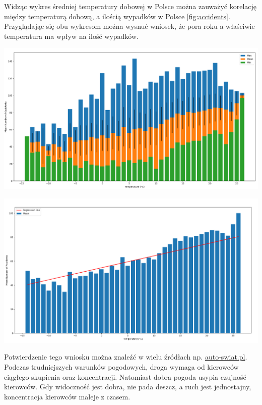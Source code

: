 \documentclass{article}
\begin{document}
Widząc wykres średniej temperatury dobowej w Polsce można zauważyć korelację między temperaturą dobową, a ilością wypadków w Polsce \ref{fig:accidents}. Przyglądając się obu wykresom można wysnuć wniosek, że pora roku a właściwie temperatura ma wpływ na ilość wypadków. 

 \begin{center}
    \includegraphics[scale=0.3]{visualization/temp_vs_accidents.png}
    \captionsetup{hypcap=false}
    \label{fig:temp_vs_accidents}
\end{center}

 \begin{center}
    \includegraphics[scale=0.3]{visualization/temp_vs_accidents_regress.png}
    \captionsetup{hypcap=false}
    \label{fig:temp_vs_accidents_regress}
\end{center}


Potwierdzenie tego wniosku można znaleźć w wielu źródłach np. \href{https://www.auto-swiat.pl/porady/kiedy-jest-najwiecej-wypadkow-na-drogach-odpowiedz-cie-zaskoczy/2gvz064}{auto-swiat.pl}. Podczas trudniejszych warunków pogodowych, droga wymaga od kierowców ciągłego skupienia oraz koncentracji. Natomiast dobra pogoda usypia czujność kierowców. Gdy widoczność jest dobra, nie pada deszcz, a ruch jest jednostajny, koncentracja kierowców maleje z czasem.
\end{document}

